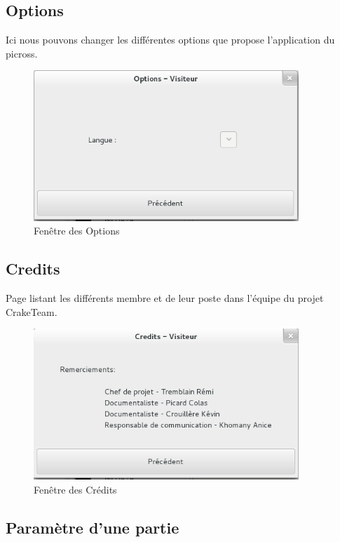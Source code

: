 \documentclass[11pt]{article}
\begin{document}
\subsection{Options}

Ici nous pouvons changer les différentes options que propose l'application du picross.

	\begin{figure}[!ht]
		\centering
		\includegraphics[width=10cm]{./Screenshot/Options.png}
		\caption{Fenêtre des Options}
	\end{figure}

\newpage

\subsection{Credits}

Page listant les différents membre et de leur poste dans l'équipe du projet CrakeTeam.

	\begin{figure}[!ht]
		\centering
		\includegraphics[width=10cm]{./Screenshot/Credits.png}
		\caption{Fenêtre des Crédits}
	\end{figure}


\subsection{Paramètre d'une partie}
\end{document}
